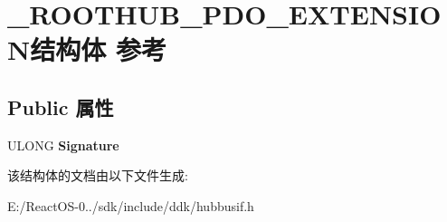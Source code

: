 \hypertarget{struct___r_o_o_t_h_u_b___p_d_o___e_x_t_e_n_s_i_o_n}{}\section{\+\_\+\+R\+O\+O\+T\+H\+U\+B\+\_\+\+P\+D\+O\+\_\+\+E\+X\+T\+E\+N\+S\+I\+O\+N结构体 参考}
\label{struct___r_o_o_t_h_u_b___p_d_o___e_x_t_e_n_s_i_o_n}
\subsection*{Public 属性}
\begin{DoxyCompactItemize}
\item 
\mbox{\label{struct___r_o_o_t_h_u_b___p_d_o___e_x_t_e_n_s_i_o_n_aada9540c2f26934cc9309398ffa3e9b4}} 
U\+L\+O\+NG {\bfseries Signature}
\end{DoxyCompactItemize}


该结构体的文档由以下文件生成\+:\begin{DoxyCompactItemize}
\item 
E\+:/\+React\+O\+S-\/0../sdk/include/ddk/hubbusif.\+h\end{DoxyCompactItemize}
